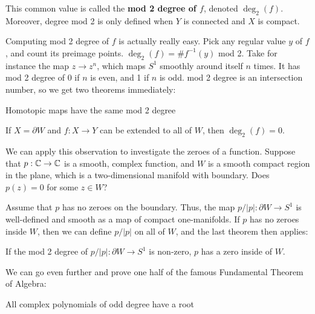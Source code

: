 This common value is called the \textbf{mod 2 degree of $f$}, denoted $\deg_2(f)$. Moreover, degree mod 2 is only defined when $Y$ is connected and $X$ is compact. 

Computing mod 2 degree of $f$ is actually really easy. Pick any regular value $y$ of $f$, and count its preimage points. $\deg_2(f) = \# f^{-1}(y)$ mod 2. Take for instance the map $z \to z^n$, which maps $S^1$ smoothly around itself $n$ times. It has mod 2 degree of 0 if $n$ is even, and 1 if $n$ is odd. mod 2 degree is an intersection number, so we get two theorems immediately:

\begin{theorem}
    Homotopic maps have the same mod 2 degree
\end{theorem}

\begin{theorem}
    If $X = \partial W$ and $f: X \to Y$ can be extended to all of $W$, then $\deg_2(f) = 0$.
\end{theorem}

We can apply this observation to investigate the zeroes of a function. Suppose that $p: \mathbb{C} \to \mathbb{C}$ is a smooth, complex function, and $W$ is a smooth compact region in the plane, which is a two-dimensional manifold with boundary. Does $p(z) = 0$ for some $z \in W$? 

Assume that $p$ has no zeroes on the boundary. Thus, the map $p/|p|: \partial W \to S^1$ is well-defined and smooth as a map of compact one-manifolds. If $p$ has no zeroes inside $W$, then we can define $p/|p|$ on all of $W$, and the last theorem then applies: 

\begin{prop}
    If the mod 2 degree of $p/|p|: \partial W \to S^1$ is non-zero, $p$ has a zero inside of $W$. 
\end{prop}

We can go even further and prove one half of the famous Fundamental Theorem of Algebra:

\begin{theorem}
    All complex polynomials of odd degree have a root
\end{theorem}

